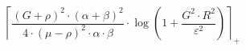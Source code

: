 \[\left\lceil \frac{\left(G + \rho\right)^{2} \cdot \left(\alpha + \beta\right)^{2}}{4 \cdot \left(\mu - \rho\right)^{2} \cdot \alpha \cdot \beta} \cdot \log\left(1 + \frac{G^{2} \cdot R^{2}}{\varepsilon^{2}}\right) \right\rceil_{+}\]
